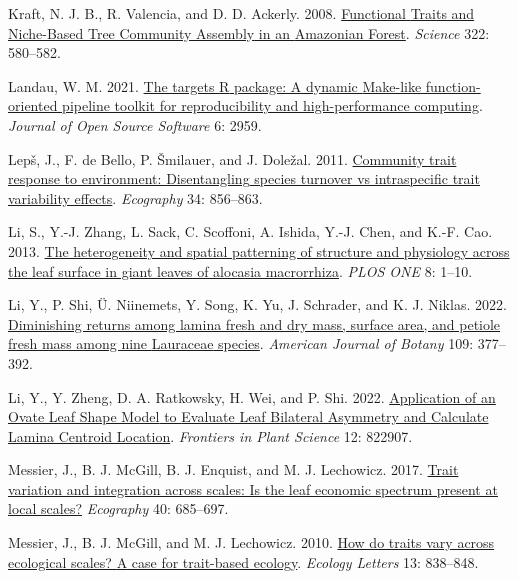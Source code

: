 \documentclass[
  12pt,
  a4paper,
,tablecaptionabove
]{scrartcl}
\newlength{\cslhangindent}
\newenvironment{CSLReferences}[2] %
 {%
  \setlength{\parindent}{0pt}
  \ifodd #1 \everypar{\setlength{\hangindent}{\cslhangindent}}\ignorespaces\fi
  \ifnum #2 > 0
  \setlength{\parskip}{#2\baselineskip}
  \fi
 }%
 {}
\begin{document}
\begin{CSLReferences}{1}{0}
\leavevmode{}%
Kraft, N. J. B., R. Valencia, and D. D. Ackerly. 2008. \href{https://doi.org/10.1126/science.1160662}{Functional {Traits} and {Niche-Based Tree Community Assembly} in an {Amazonian Forest}}. \emph{Science} 322: 580--582.

\leavevmode{}%
Landau, W. M. 2021. \href{https://doi.org/10.21105/joss.02959}{The targets {R} package: A dynamic {Make-like} function-oriented pipeline toolkit for reproducibility and high-performance computing}. \emph{Journal of Open Source Software} 6: 2959.

\leavevmode{}%
Lepš, J., F. de Bello, P. Šmilauer, and J. Doležal. 2011. \href{https://doi.org/10.1111/j.1600-0587.2010.06904.x}{Community trait response to environment: {Disentangling} species turnover vs intraspecific trait variability effects}. \emph{Ecography} 34: 856--863.

\leavevmode{}%
Li, S., Y.-J. Zhang, L. Sack, C. Scoffoni, A. Ishida, Y.-J. Chen, and K.-F. Cao. 2013. \href{https://doi.org/10.1371/journal.pone.0066016}{The heterogeneity and spatial patterning of structure and physiology across the leaf surface in giant leaves of alocasia macrorrhiza}. \emph{PLOS ONE} 8: 1--10.

\leavevmode{}%
Li, Y., P. Shi, Ü. Niinemets, Y. Song, K. Yu, J. Schrader, and K. J. Niklas. 2022. \href{https://doi.org/10.1002/ajb2.1812}{Diminishing returns among lamina fresh and dry mass, surface area, and petiole fresh mass among nine {Lauraceae} species}. \emph{American Journal of Botany} 109: 377--392.

\leavevmode{}%
Li, Y., Y. Zheng, D. A. Ratkowsky, H. Wei, and P. Shi. 2022. \href{https://doi.org/10.3389/fpls.2021.822907}{Application of an {Ovate Leaf Shape Model} to {Evaluate Leaf Bilateral Asymmetry} and {Calculate Lamina Centroid Location}}. \emph{Frontiers in Plant Science} 12: 822907.

\leavevmode{}%
Messier, J., B. J. McGill, B. J. Enquist, and M. J. Lechowicz. 2017. \href{https://doi.org/10.1111/ecog.02006}{Trait variation and integration across scales: Is the leaf economic spectrum present at local scales?} \emph{Ecography} 40: 685--697.

\leavevmode{}%
Messier, J., B. J. McGill, and M. J. Lechowicz. 2010. \href{https://doi.org/10.1111/j.1461-0248.2010.01476.x}{How do traits vary across ecological scales? {A} case for trait-based ecology}. \emph{Ecology Letters} 13: 838--848.


\end{CSLReferences}
\end{document}
